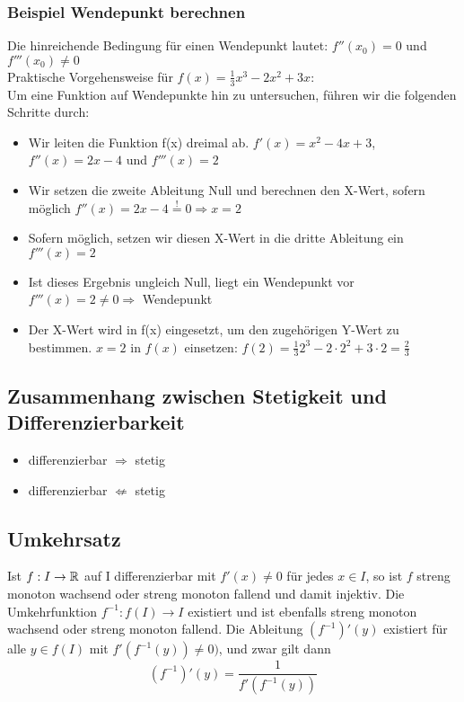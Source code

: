 \subsubsection{Beispiel Wendepunkt berechnen}
Die hinreichende Bedingung für einen Wendepunkt lautet: $f''(x_0) = 0$ und $f'''(x_0) \not= 0$\\
 
Praktische Vorgehensweise für $f(x) = \frac{1}{3}x^3-2x^2+3x$:\\
Um eine Funktion auf Wendepunkte hin zu untersuchen, führen wir die folgenden Schritte durch:
\begin{itemize}
	\item Wir leiten die Funktion f(x) dreimal ab. $f'(x) = x^2-4x+3$, $f''(x) = 2x-4$ und $f'''(x) = 2$
	\item Wir setzen die zweite Ableitung Null und berechnen den X-Wert, sofern möglich  
		$f''(x) = 2x-4 \stackrel{!}{=} 0 \Rightarrow x = 2$ 
	\item Sofern möglich, setzen wir diesen X-Wert in die dritte Ableitung ein
		$f'''(x) = 2$
	\item Ist dieses Ergebnis ungleich Null, liegt ein Wendepunkt vor
		$f'''(x) = 2 \not= 0 \Rightarrow$ Wendepunkt
	\item Der X-Wert wird in f(x) eingesetzt, um den zugehörigen Y-Wert zu bestimmen.
		$x = 2$ in $f(x)$ einsetzen: $f(2) = \frac{1}{3}2^3-2\cdot2^2+3\cdot2 = \frac{2}{3}$
\end{itemize}

\subsection{Zusammenhang zwischen Stetigkeit und Differenzierbarkeit}
\begin{itemize}
	\item differenzierbar $\Rightarrow$ stetig
	\item differenzierbar $\not\Leftarrow$ stetig
\end{itemize}

\subsection{Umkehrsatz}
Ist $f:I \to \mathbb{R}$ auf I differenzierbar mit $f'(x) \neq 0$ für jedes $x \in I$,
so ist $f$ streng monoton wachsend oder streng monoton fallend und damit
injektiv. Die Umkehrfunktion $f^{-1}:f(I) \to I$ existiert und ist ebenfalls
streng monoton wachsend oder streng monoton fallend. Die Ableitung
$(f^{-1})'(y)$ existiert für alle $y \in f(I)$ mit $f'(f^{-1}(y)) \neq 0)$, und zwar gilt dann \[ (f^{-1})'(y) = \frac{1}{f'(f^{-1}(y))}
\]

